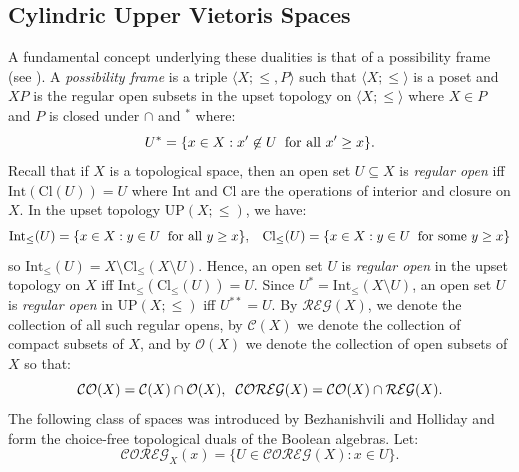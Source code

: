 \documentclass[reqno]{amsart}
\theoremstyle{plain}
\theoremstyle{definition}
\begin{document}
\subsection{Cylindric Upper Vietoris Spaces}
 A fundamental concept underlying these dualities is that of a possibility frame (see \cite{bez, holliday}). A \emph{possibility frame} is a triple $\langle X;\leq,P\rangle$ such that $\langle X;\leq\rangle$ is a poset and $XP$ is the regular open subsets in the upset topology on $\langle X;\leq\rangle$ where $X\in P$ and $P$ is closed under $\cap$ and $^*$ where: 
\[U^*=\{x\in X:x'\not\in U\hspace{.2cm}\text{for all $x'\geq x$}\}.\]
Recall that if $X$ is a topological space, then an open set $U\subseteq X$ is \emph{regular open} iff $\text{Int}(\text{Cl}(U))=U$ where $\text{Int}$ and $\text{Cl}$ are the operations of interior and closure on $X$. In the upset topology $\text{UP}(X;\leq)$, we have: 
\[\text{Int}_{\leq}(U)=\{x\in X:y\in U\hspace{.2cm}\text{for all $y\geq x$}\},\hspace{.3cm}\text{Cl}_{\leq}(U)=\{x\in X:y\in U\hspace{.2cm}\text{for some $y\geq x$}\}\]
 so $\text{Int}_{\leq}(U)=X\setminus\text{Cl}_{\leq}(X\setminus U)$. Hence, an open set $U$ is \emph{regular open} in the upset topology on $X$ iff $\text{Int}_{\leq}(\text{Cl}_{\leq}(U))=U$. Since $U^*=\text{Int}_{\leq}(X\setminus U)$, an open set $U$ is \emph{regular open} in $\text{UP}(X;\leq)$ iff $U^{**}=U$. By $\mathcal{REG}(X)$, we denote the collection of all such regular opens, by $\mathcal{C}(X)$ we denote the collection of compact subsets of $X$, and by $\mathcal{O}(X)$ we denote the collection of open subsets of $X$ so that: 
\[\mathcal{CO}(X)=\mathcal{C}(X)\cap\mathcal{O}(X),\hspace{.2cm}\mathcal{COREG}(X)=\mathcal{CO}(X)\cap\mathcal{REG}(X).\]
The following class of spaces was introduced by Bezhanishvili and Holliday \cite{bez} and form the choice-free topological duals of the Boolean algebras. Let: 
\[\mathcal{COREG}_X(x)=\{U\in\mathcal{COREG}(X):x\in U\}.\]
\end{document}
